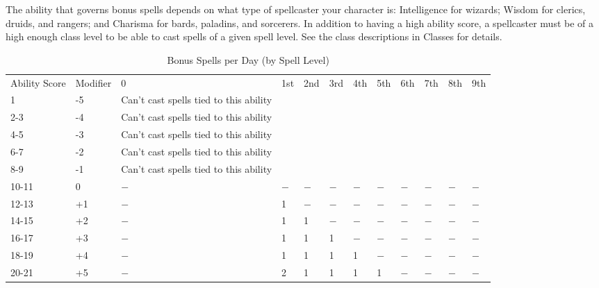 				
The ability that governs bonus spells depends on what type of spellcaster your character is: Intelligence for wizards; Wisdom for clerics, druids, and rangers; and Charisma for bards, paladins, and sorcerers. In addition to having a high ability score, a spellcaster must be of a high enough class level to be able to cast spells of a given spell level. See the class descriptions in Classes for details.
\begin{table}[]
\caption{Bonus Spells per Day (by Spell Level)}
\begin{tabular}{llllllllllll}
Ability Score & Modifier & 0                                      & 1st & 2nd & 3rd & 4th & 5th & 6th & 7th & 8th & 9th \\
1             & -5       & Can't cast spells tied to this ability &     &     &     &     &     &     &     &     &     \\
2-3           & -4       & Can't cast spells tied to this ability &     &     &     &     &     &     &     &     &     \\
4-5           & -3       & Can't cast spells tied to this ability &     &     &     &     &     &     &     &     &     \\
6-7           & -2       & Can't cast spells tied to this ability &     &     &     &     &     &     &     &     &     \\
8-9           & -1       & Can't cast spells tied to this ability &     &     &     &     &     &     &     &     &     \\
10-11         & 0        & $-$                                      & $-$   & $-$   & $-$   & $-$   & $-$   & $-$   & $-$   & $-$   & $-$   \\
12-13         & +1       & $-$                                      & 1   & $-$   & $-$   & $-$   & $-$   & $-$   & $-$   & $-$   & $-$   \\
14-15         & +2       & $-$                                      & 1   & 1   & $-$   & $-$   & $-$   & $-$   & $-$   & $-$   & $-$   \\
16-17         & +3       & $-$                                      & 1   & 1   & 1   & $-$   & $-$   & $-$   & $-$   & $-$   & $-$   \\
18-19         & +4       & $-$                                      & 1   & 1   & 1   & 1   & $-$   & $-$   & $-$   & $-$   & $-$   \\
20-21         & +5       & $-$                                      & 2   & 1   & 1   & 1   & 1   & $-$   & $-$   & $-$   & $-$   \\

\end{tabular}
\end{table}
